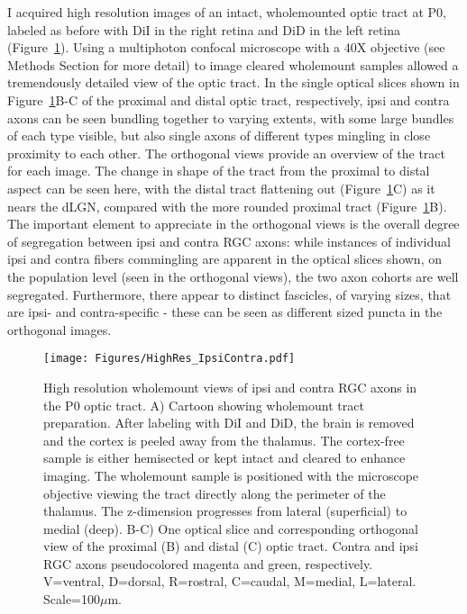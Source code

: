 I acquired high resolution images of an intact, wholemounted optic tract at P0, labeled as before with DiI in the right retina and DiD in the left retina (Figure~\ref{Figures/HighResIpsiContra}).
Using a multiphoton confocal microscope with a 40X objective (see Methods Section for more detail) to image cleared wholemount samples allowed a tremendously detailed view of the optic tract.
In the single optical slices shown in Figure~\ref{Figures/HighResIpsiContra}B-C of the proximal and distal optic tract, respectively, ipsi and contra axons can be seen bundling together to varying extents, with some large bundles of each type visible, but also single axons of different types mingling in close proximity to each other.
The orthogonal views provide an overview of the tract for each image.
The change in shape of the tract from the proximal to distal aspect can be seen here, with the distal tract flattening out (Figure~\ref{Figures/HighResIpsiContra}C) as it nears the dLGN, compared with the more rounded proximal tract (Figure~\ref{Figures/HighResIpsiContra}B).
The important element to appreciate in the orthogonal views is the overall degree of segregation between ipsi and contra RGC axons: while instances of individual ipsi and contra fibers commingling are apparent in the optical slices shown, on the population level (seen in the orthogonal views), the two axon cohorts are well segregated.
Furthermore, there appear to distinct fascicles, of varying sizes, that are ipsi- and contra-specific - these can be seen as different sized puncta in the orthogonal images.
\begin{figure}[hbtp]
    \begin{center}
        \texttt{[image: Figures/HighRes\_IpsiContra.pdf]}
        \caption[High resolution wholemount views of ipsi and contra RGC axons in the P0 optic tract.]
        {High resolution wholemount views of ipsi and contra RGC axons in the P0 optic tract.
        A) Cartoon showing wholemount tract preparation.
        After labeling with DiI and DiD, the brain is removed and the cortex is peeled away from the thalamus.
        The cortex-free sample is either hemisected or kept intact and cleared to enhance imaging.
        The wholemount sample is positioned with the microscope objective viewing the tract directly along the perimeter of the thalamus.
        The z-dimension progresses from lateral (superficial) to medial (deep).
        B-C) One optical slice and corresponding orthogonal view of the proximal (B) and distal (C) optic tract.
        Contra and ipsi RGC axons pseudocolored magenta and green, respectively.
        V=ventral, D=dorsal, R=rostral, C=caudal, M=medial, L=lateral.
        Scale=100$\mu$m.
        }
        \label{Figures/HighResIpsiContra}
    \end{center}
\end{figure}

